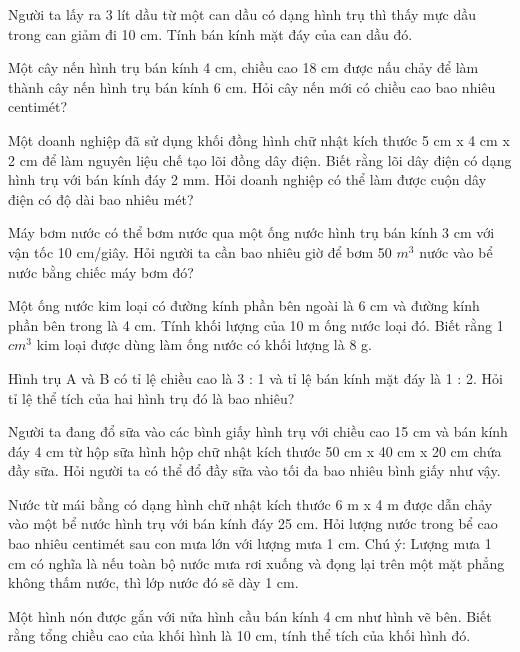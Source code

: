 \documentclass[%
    fontsize=12pt,%
    chapterprefix=false,%
    open=right,%
    twoside=false,%
    numbers=noenddot,%
    headings=optiontohead,%
    final,%
    DIV=15,%
    parskip=half %
]{scrbook}
\begin{document}
\begin{tuluan}

\item Người ta lấy ra 3 lít dầu từ một can dầu có dạng hình trụ thì thấy mực dầu trong can giảm đi 10 cm. Tính bán kính mặt đáy của can dầu đó.

\item Một cây nến hình trụ bán kính 4 cm, chiều cao 18 cm được nấu chảy để làm thành cây nến hình trụ bán kính 6 cm. Hỏi cây nến mới có chiều cao bao nhiêu centimét?

\item Một doanh nghiệp đã sử dụng khối đồng hình chữ nhật kích thước 5 cm x 4 cm x 2 cm để làm nguyên liệu chế tạo lõi đồng dây điện. Biết rằng lõi dây điện có dạng hình trụ với bán kính đáy 2 mm. Hỏi doanh nghiệp có thể làm được cuộn dây điện có độ dài bao nhiêu mét?

\item Máy bơm nước có thể bơm nước qua một ống nước hình trụ bán kính 3 cm với vận tốc 10 cm/giây. Hỏi người ta cần bao nhiêu giờ để bơm 50 $m^3$ nước vào bể nước bằng chiếc máy bơm đó?

\item Một ống nước kim loại có đường kính phần bên ngoài là 6 cm và đường kính phần bên trong là 4 cm. Tính khối lượng của 10 m ống nước loại đó. Biết rằng 1 $cm^3$ kim loại được dùng làm ống nước có khối lượng là 8 g.

\item Hình trụ A và B có tỉ lệ chiều cao là 3 : 1 và tỉ lệ bán kính mặt đáy là 1 : 2. Hỏi tỉ lệ thể tích của hai hình trụ đó là bao nhiêu?

\item Người ta đang đổ sữa vào các bình giấy hình trụ với chiều cao 15 cm và bán kính đáy 4 cm từ hộp sữa hình hộp chữ nhật kích thước 50 cm x 40 cm x 20 cm chứa đầy sữa. Hỏi người ta có thể đổ đầy sữa vào tối đa bao nhiêu bình giấy như vậy.

\item Nước từ mái bằng có dạng hình chữ nhật kích thước 6 m x 4 m được dẫn chảy vào một bể nước hình trụ với bán kính đáy 25 cm. Hỏi lượng nước trong bể cao bao nhiêu centimét sau con mưa lớn với lượng mưa 1 cm. Chú ý: Lượng mưa 1 cm có nghĩa là nếu toàn bộ nước mưa rơi xuống và đọng lại trên một mặt phẳng không thấm nước, thì lớp nước đó sẽ dày 1 cm.

\item Một hình nón được gắn với nửa hình cầu bán kính 4 cm như hình vẽ bên. Biết rằng tổng chiều cao của khối hình là 10 cm, tính thể tích của khối hình đó.


\end{tuluan}
\end{document}
